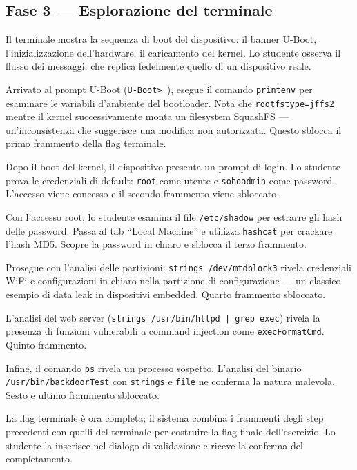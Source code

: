\subsection{Fase 3 --- Esplorazione del terminale}
\label{subsec:fase3-terminale}


Il terminale mostra la sequenza di boot del dispositivo: il banner U-Boot, l'inizializzazione dell'hardware, il caricamento del kernel. Lo studente osserva il flusso dei messaggi, che replica fedelmente quello di un dispositivo reale.

Arrivato al prompt U-Boot (\texttt{U-Boot> }), esegue il comando \texttt{printenv} per esaminare le variabili d'ambiente del bootloader. Nota che \texttt{rootfstype=jffs2} mentre il kernel successivamente monta un filesystem SquashFS --- un'inconsistenza che suggerisce una modifica non autorizzata. Questo sblocca il primo frammento della flag terminale.

Dopo il boot del kernel, il dispositivo presenta un prompt di login. Lo studente prova le credenziali di default: \texttt{root} come utente e \texttt{sohoadmin} come password. L'accesso viene concesso e il secondo frammento viene sbloccato.

Con l'accesso root, lo studente esamina il file \texttt{/etc/shadow} per estrarre gli hash delle password. Passa al tab ``Local Machine'' e utilizza \texttt{hashcat} per crackare l'hash MD5. Scopre la password in chiaro e sblocca il terzo frammento.

Prosegue con l'analisi delle partizioni: \texttt{strings /dev/mtdblock3} rivela credenziali WiFi e configurazioni in chiaro nella partizione di configurazione --- un classico esempio di data leak in dispositivi embedded. Quarto frammento sbloccato.

L'analisi del web server (\texttt{strings /usr/bin/httpd | grep exec}) rivela la presenza di funzioni vulnerabili a command injection come \texttt{execFormatCmd}. Quinto frammento.

Infine, il comando \texttt{ps} rivela un processo sospetto. L'analisi del binario \texttt{/usr/bin/backdoorTest} con \texttt{strings} e \texttt{file} ne conferma la natura malevola. Sesto e ultimo frammento sbloccato.

La flag terminale è ora completa; il sistema combina i frammenti degli step precedenti con quelli del terminale per costruire la flag finale dell'esercizio. Lo studente la inserisce nel dialogo di validazione e riceve la conferma del completamento.

